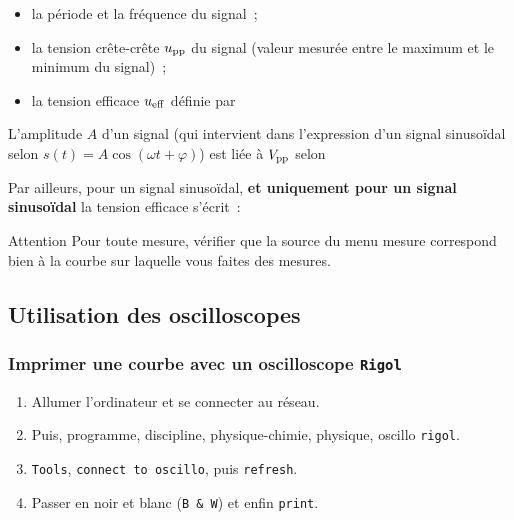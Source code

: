 \documentclass[a4paper, 11pt, final, garamond]{book}
\begin{document}
\begin{itemize}
    \item la période et la fréquence du signal~;
    \item la tension crête-crête $u_{\rm pp}$ du signal (valeur mesurée entre le
        maximum et le minimum du signal)~;
    \item la tension efficace $u_{\rm eff}$ définie par
\end{itemize}

\begin{minipage}{0.45\linewidth}
    L'amplitude $A$ d'un signal (qui intervient dans l'expression d'un signal
    sinusoïdal selon $s(t) = A \cos(\omega t + \varphi)$) est liée à $V_{\rm
    pp}$ selon

\end{minipage}
\hfill
\begin{minipage}{0.45\linewidth}
    Par ailleurs, pour un signal sinusoïdal, \textbf{et uniquement pour un
    signal sinusoïdal} la tension efficace s'écrit~:

\end{minipage}

\begin{NCror}[width=\linewidth]{Attention}
    Pour toute mesure, vérifier que la source du menu mesure correspond bien à
    la courbe sur laquelle vous faites des mesures.
\end{NCror}

\subsection{Utilisation des oscilloscopes}
\subsubsection{Imprimer une courbe avec un oscilloscope \texttt{Rigol}}

\begin{enumerate}
    \item Allumer l'ordinateur et se connecter au réseau.
    \item Puis, programme, discipline, physique-chimie, physique, oscillo
        \texttt{rigol}.
    \item \texttt{Tools}, \texttt{connect to oscillo}, puis \texttt{refresh}.
    \item Passer en noir et blanc (\texttt{B \& W}) et enfin \texttt{print}.
\end{enumerate}
\end{document}
